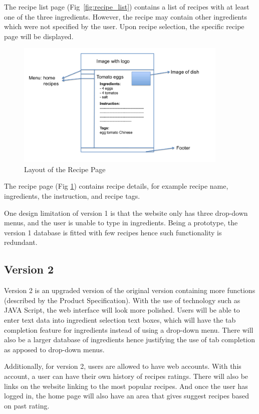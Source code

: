 The recipe list page (Fig~\ref{fig:recipe_list}) contains a list of recipes with at least one of the three ingredients. However, the recipe may contain other ingredients which were not specified by the user. Upon recipe selection, the specific recipe page will be displayed.

\begin{figure}
\includegraphics[width=0.9\textwidth]{recipe_page}
\caption{Layout of the Recipe Page}
\label{fig:recipe_page}
\end{figure}

The recipe page (Fig \ref{fig:recipe_page}) contains recipe details, for example recipe name, ingredients, the instruction, and recipe tags.
 
One design limitation of version 1 is that the website only has three drop-down menus, and the user is unable to type in ingredients. Being a prototype, the version 1 database is fitted with few recipes hence such functionality is redundant. 

\subsection{Version 2}
Version 2 is an upgraded version of the original version containing more functions (described by the Product Specification). With the use of technology such as JAVA Script, the web interface will look more polished. Users will be able to enter text data into ingredient selection text boxes, which will have the tab completion feature for ingredients instead of using a drop-down menu. There will also be a larger database of ingredients hence justifying the use of tab completion as apposed to drop-down menus.

Additionally, for version 2, users are allowed to have web accounts. With this account, a user can have their own history of recipes ratings. There will also be links on the website linking to the most popular recipes. And once the user has logged in, the home page will also have an area that gives suggest recipes based on past rating. 

